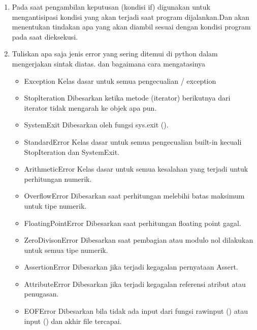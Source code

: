 \begin{enumerate}
    \item Pada saat pengambilan keputusan (kondisi if) digunakan untuk mengantisipasi kondisi yang akan terjadi saat program dijalankan.Dan akan menentukan tindakan apa yang akan diambil sesuai dengan kondisi program pada saat dieksekusi.
    

    \item Tuliskan apa saja jenis error yang sering ditemui di python dalam mengerjakan
    sintak diatas. dan bagaimana cara mengatasinya
    \begin{itemize}
        \item Exception
        Kelas dasar untuk semua pengecualian / exception

        \item Stoplteration
        Dibesarkan ketika metode (iterator) berikutnya dari iterator tidak mengarah ke objek apa pun.

        \item SystemExit
        Dibesarkan oleh fungsi sys.exit ().

        \item StandardError
        Kelas dasar untuk semua pengecualian built-in kecuali StopIteration dan SystemExit.

        \item ArithmeticError
        Kelas dasar untuk semua kesalahan yang terjadi untuk perhitungan numerik.

        \item OverflowError
        Dibesarkan saat perhitungan melebihi batas maksimum untuk tipe numerik.

        \item FloatingPointError
        Dibesarkan saat perhitungan floating point gagal.

        \item ZeroDivisonError
        Dibesarkan saat pembagian atau modulo nol dilakukan untuk semua tipe numerik.

        \item AssertionError
        Dibesarkan jika terjadi kegagalan pernyataan Assert.

        \item AttributeError
        Dibesarkan jika terjadi kegagalan referensi atribut atau penugasan.
         
        \item EOFError
        Dibesarkan bila tidak ada input dari fungsi rawinput () atau input () dan akhir file tercapai.


\end{itemize}
\end{enumerate}
